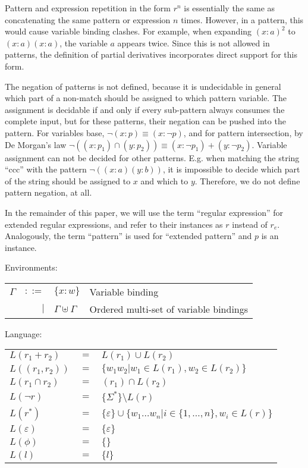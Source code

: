 Pattern and expression repetition in the form $r^n$ is essentially the same as
concatenating the same pattern or expression $n$ times. However, in a pattern,
this would cause variable binding clashes. For example, when expanding
$(x:a)^2$ to $(x:a)(x:a)$, the variable $a$ appears twice. Since this is not
allowed in patterns, the definition of partial derivatives incorporates direct
support for this form.

The negation of patterns is not defined, because it is undecidable in general
which part of a non-match should be assigned to which pattern variable. The
assignment is decidable if and only if every sub-pattern always consumes the
complete input, but for these patterns, their negation can be pushed into the
pattern. For variables base, $\neg(x:p) \equiv (x:\neg p)$, and for pattern
intersection, by De Morgan's law $\neg((x:p_1) \cap (y:p_2)) \equiv (x:\neg
p_1) + (y:\neg p_2)$. Variable assignment can not be decided for other
patterns. E.g. when matching the string ``ccc'' with the pattern
$\neg((x:a)(y:b))$, it is impossible to decide which part of the string should
be assigned to $x$ and which to $y$. Therefore, we do not define pattern
negation, at all.

In the remainder of this paper, we will use the term ``regular expression''
for extended regular expressions, and refer to their instances as $r$ instead
of $r_e$.  Analogously, the term ``pattern'' is used for ``extended pattern''
and $p$ is an instance.

Environments:

\begin{tabular}{lrll}
   $\Gamma$	& $::=$	& $\{x:w\}$			& Variable binding	\\
		& $|$	& $\Gamma \uplus \Gamma$	& Ordered multi-set of
							  variable bindings	\\
\end{tabular}

Language:

\begin{tabular}{lll}
   $L(r_1 + r_2)$	& $=$	& $L(r_1) \cup L(r_2)$					\\
   $L((r_1, r_2))$	& $=$	& $\{ w_1w_2 | w_1 \in L(r_1), w_2 \in L(r_2) \}$	\\
   $L(r_1 \cap r_2)$	& $=$	& $(r_1) \cap L(r_2)$					\\
   $L(\neg r)$		& $=$	& $\{\Sigma^*\} \setminus L(r)$				\\
   $L(r^*)$		& $=$	&
      $\{\varepsilon\} \cup \{ w_1 \dots w_n | i
      \in \{ 1, \dots, n \}, w_i \in L(r) \}$	\\
   $L(\varepsilon)$	& $=$	& $\{\varepsilon\}$					\\
   $L(\phi)$		& $=$	& $\{\}$						\\
   $L(l)$		& $=$	& $\{l\}$						\\
\end{tabular}

